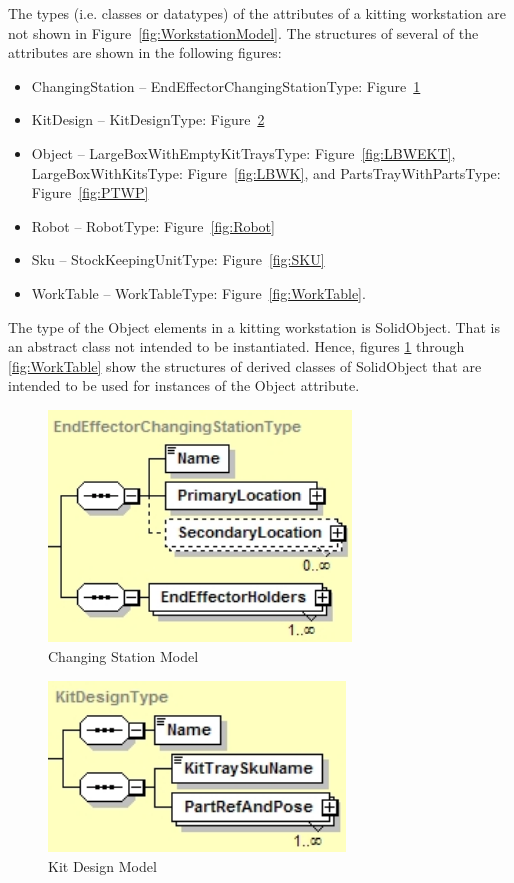The types (i.e. classes or datatypes) of the attributes of a kitting
workstation are not shown in Figure~\ref{fig:WorkstationModel}. The
structures of several of the attributes are shown in the following figures:
\begin{itemize}
\item ChangingStation -- EndEffectorChangingStationType:
  Figure~\ref{fig:ChangingStation}
\item KitDesign -- KitDesignType: Figure~\ref{fig:KitDesign}
\item Object -- LargeBoxWithEmptyKitTraysType: Figure~\ref{fig:LBWEKT},
  LargeBoxWithKitsType: Figure~\ref{fig:LBWK}, and PartsTrayWithPartsType:
  Figure~\ref{fig:PTWP}
\item Robot -- RobotType: Figure~\ref{fig:Robot}
\item Sku -- StockKeepingUnitType: Figure~\ref{fig:SKU}
\item WorkTable -- WorkTableType: Figure~\ref{fig:WorkTable}.
\end{itemize}

The type of the Object elements in a kitting workstation is
SolidObject. That is an abstract class not intended to be
instantiated. Hence, figures \ref{fig:ChangingStation} through
\ref{fig:WorkTable} show the structures of derived classes of
SolidObject that are intended to be used for instances of the Object
attribute.

\begin{figure}[htb!]
\centering
\includegraphics[width=3.166in]{images/changingStation.jpg}
\caption{Changing Station Model}
\label{fig:ChangingStation}
\end{figure}

\begin{figure}[htb!]
\centering
\includegraphics[width=3.1in]{images/kitDesign.jpg}
\caption{Kit Design Model}
\label{fig:KitDesign}
\end{figure}

